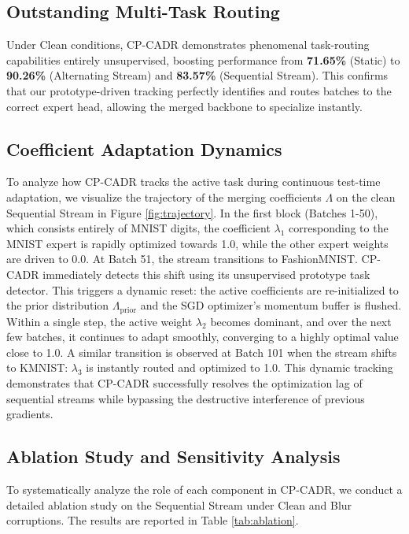 \documentclass{article}
\theoremstyle{plain}
\theoremstyle{definition}
\theoremstyle{remark}
\begin{document}
\subsection{Outstanding Multi-Task Routing}
Under Clean conditions, CP-CADR demonstrates phenomenal task-routing capabilities entirely unsupervised, boosting performance from \textbf{71.65\%} (Static) to \textbf{90.26\%} (Alternating Stream) and \textbf{83.57\%} (Sequential Stream). This confirms that our prototype-driven tracking perfectly identifies and routes batches to the correct expert head, allowing the merged backbone to specialize instantly.

\subsection{Coefficient Adaptation Dynamics}
To analyze how CP-CADR tracks the active task during continuous test-time adaptation, we visualize the trajectory of the merging coefficients $\Lambda$ on the clean Sequential Stream in Figure \ref{fig:trajectory}. 
In the first block (Batches 1-50), which consists entirely of MNIST digits, the coefficient $\lambda_1$ corresponding to the MNIST expert is rapidly optimized towards 1.0, while the other expert weights are driven to 0.0. 
At Batch 51, the stream transitions to FashionMNIST. CP-CADR immediately detects this shift using its unsupervised prototype task detector. This triggers a dynamic reset: the active coefficients are re-initialized to the prior distribution $\Lambda_{\text{prior}}$ and the SGD optimizer's momentum buffer is flushed. 
Within a single step, the active weight $\lambda_2$ becomes dominant, and over the next few batches, it continues to adapt smoothly, converging to a highly optimal value close to 1.0. 
A similar transition is observed at Batch 101 when the stream shifts to KMNIST: $\lambda_3$ is instantly routed and optimized to 1.0. 
This dynamic tracking demonstrates that CP-CADR successfully resolves the optimization lag of sequential streams while bypassing the destructive interference of previous gradients.

\subsection{Ablation Study and Sensitivity Analysis}
To systematically analyze the role of each component in CP-CADR, we conduct a detailed ablation study on the Sequential Stream under Clean and Blur corruptions. The results are reported in Table \ref{tab:ablation}.
\end{document}
